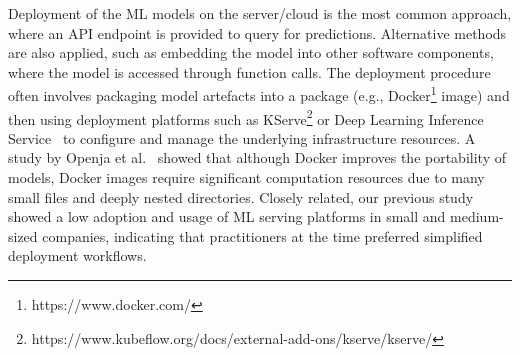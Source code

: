 
Deployment of the ML models on the server/cloud is the most common approach, where an API endpoint is provided to query for predictions. Alternative methods are also applied, such as embedding the model into other software components, where the model is accessed through function calls. The deployment procedure often involves packaging model artefacts into a package (e.g., Docker\footnote{https://www.docker.com/} image) and then using deployment platforms such as KServe\footnote{https://www.kubeflow.org/docs/external-add-ons/kserve/kserve/} or Deep Learning Inference Service~\cite{soifer2019deep} to configure and manage the underlying infrastructure resources. A study by Openja et al.~\cite{openja} showed that although Docker improves the portability of models, Docker images require significant computation resources due to many small files and deeply nested directories. Closely related, our previous study~\cite{muiruri2022practices} showed a low adoption and usage of ML serving platforms in small and medium-sized companies, indicating that practitioners at the time preferred simplified deployment workflows.

